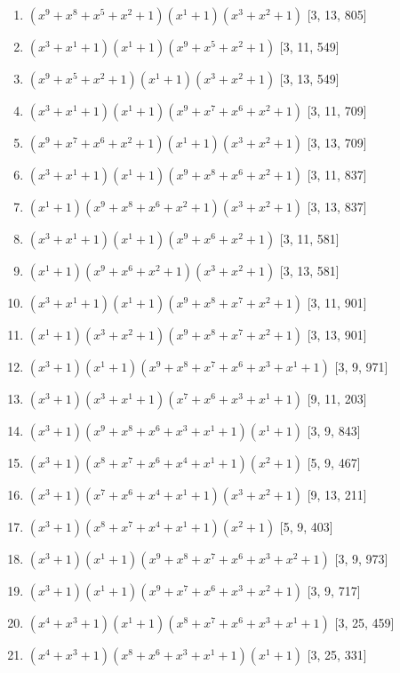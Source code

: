 \documentclass[10pt,twocolumn]{article}
\begin{document}
\begin{enumerate}
\item $(x^{9} + x^{8} + x^{5} + x^{2} + 1)(x^{1} + 1)(x^{3} + x^{2} + 1)$  [3, 13, 805]
\item $(x^{3} + x^{1} + 1)(x^{1} + 1)(x^{9} + x^{5} + x^{2} + 1)$  [3, 11, 549]
\item $(x^{9} + x^{5} + x^{2} + 1)(x^{1} + 1)(x^{3} + x^{2} + 1)$  [3, 13, 549]
\item $(x^{3} + x^{1} + 1)(x^{1} + 1)(x^{9} + x^{7} + x^{6} + x^{2} + 1)$  [3, 11, 709]
\item $(x^{9} + x^{7} + x^{6} + x^{2} + 1)(x^{1} + 1)(x^{3} + x^{2} + 1)$  [3, 13, 709]
\item $(x^{3} + x^{1} + 1)(x^{1} + 1)(x^{9} + x^{8} + x^{6} + x^{2} + 1)$  [3, 11, 837]
\item $(x^{1} + 1)(x^{9} + x^{8} + x^{6} + x^{2} + 1)(x^{3} + x^{2} + 1)$  [3, 13, 837]
\item $(x^{3} + x^{1} + 1)(x^{1} + 1)(x^{9} + x^{6} + x^{2} + 1)$  [3, 11, 581]
\item $(x^{1} + 1)(x^{9} + x^{6} + x^{2} + 1)(x^{3} + x^{2} + 1)$  [3, 13, 581]
\item $(x^{3} + x^{1} + 1)(x^{1} + 1)(x^{9} + x^{8} + x^{7} + x^{2} + 1)$  [3, 11, 901]
\item $(x^{1} + 1)(x^{3} + x^{2} + 1)(x^{9} + x^{8} + x^{7} + x^{2} + 1)$  [3, 13, 901]
\item $(x^{3} + 1)(x^{1} + 1)(x^{9} + x^{8} + x^{7} + x^{6} + x^{3} + x^{1} + 1)$  [3, 9, 971]
\item $(x^{3} + 1)(x^{3} + x^{1} + 1)(x^{7} + x^{6} + x^{3} + x^{1} + 1)$  [9, 11, 203]
\item $(x^{3} + 1)(x^{9} + x^{8} + x^{6} + x^{3} + x^{1} + 1)(x^{1} + 1)$  [3, 9, 843]
\item $(x^{3} + 1)(x^{8} + x^{7} + x^{6} + x^{4} + x^{1} + 1)(x^{2} + 1)$  [5, 9, 467]
\item $(x^{3} + 1)(x^{7} + x^{6} + x^{4} + x^{1} + 1)(x^{3} + x^{2} + 1)$  [9, 13, 211]
\item $(x^{3} + 1)(x^{8} + x^{7} + x^{4} + x^{1} + 1)(x^{2} + 1)$  [5, 9, 403]
\item $(x^{3} + 1)(x^{1} + 1)(x^{9} + x^{8} + x^{7} + x^{6} + x^{3} + x^{2} + 1)$  [3, 9, 973]
\item $(x^{3} + 1)(x^{1} + 1)(x^{9} + x^{7} + x^{6} + x^{3} + x^{2} + 1)$  [3, 9, 717]
\item $(x^{4} + x^{3} + 1)(x^{1} + 1)(x^{8} + x^{7} + x^{6} + x^{3} + x^{1} + 1)$  [3, 25, 459]
\item $(x^{4} + x^{3} + 1)(x^{8} + x^{6} + x^{3} + x^{1} + 1)(x^{1} + 1)$  [3, 25, 331]

\end{enumerate}
\end{document}
